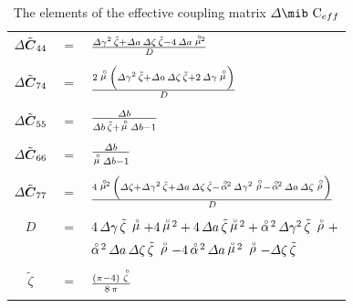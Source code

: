 \begin{table}
\begin{tabular*}{136mm}{ccl}
         
${{\mit \Delta} \tilde{\bmi C}}_{44}$&$=$& ${{{{\mit \Delta} \gamma^2}\,{\tilde{\zeta}}
 + {\mit \Delta}a\,{\mit \Delta} \zeta\,{\tilde{\zeta}} - 4\,{\mit 
\Delta}a\,{\rf{\mu}\!{}^{2}}}\over {{\it D}}} $\\

&&\\

${{\mit \Delta} \tilde{\bmi C}}_{74}$&$=$&${{2\,\rf{\mu}\,
       \left( {{\mit \Delta} \gamma^2}\,{\tilde{\zeta}} + {\mit \Delta}a\,{\mit \Delta} \zeta\,{\tilde{\zeta}} + 
         2\,{\mit \Delta} \gamma\,\rf{\mu} \right) }\over {{\it D}}}$\\

&&\\

${{\mit \Delta} \tilde{\bmi C}}_{55}$&$=$&${{{\mit \Delta}b}\over 
     {{\mit \Delta}b\,{\tilde{\zeta}} + \rf{\mu}\,{\mit \Delta}b -1 }}$\\

&&\\

${{\mit \Delta} \tilde{\bmi C}}_{66}$&$=$&${{{\mit \Delta}b}\over 
{\rf{\mu}\,{\mit \Delta}b  -1}}$\\

&&\\

${{\mit \Delta} \tilde{\bmi C}}_{77}$&$=$&${{4\,{\rf{\mu}\!{}^{2}}\,\left( {\mit \Delta} \zeta + {{\mit \Delta} \gamma^2}\,{\tilde{\zeta}} + 
         {\mit \Delta}a\,{\mit \Delta} \zeta\,{\tilde{\zeta}} - 
         {\rf{\alpha}\!{}^2}\,{{\mit \Delta} \gamma^2}\,\rf{\rho} - 
         {\rf{\alpha}\!{}^2}\,{\mit \Delta}a\,{\mit \Delta} \zeta\,\rf{\rho} \right) }\over 
         {{\it D}}}$\\

&&\\

$D$&$=$&$4\,{\mit \Delta} \gamma\,{\tilde{\zeta}}\,\rf{\mu} + 
  4\,{\rf{\mu}\!{}^{2}} + 4\,{\mit \Delta}a\,{\tilde{\zeta}}\,{\rf{\mu}\!{}^{2}} + 
  {\rf{\alpha}\!{}^2}\,{{\mit \Delta} 
  \gamma^2}\,{\tilde{\zeta}}\,\rf{\rho} +$\\
&& ${\rf{\alpha}\!{}^2}\,{\mit \Delta}a\,{\mit \Delta} \zeta\,{\tilde{\zeta}}\,\rf{\rho} - 
  4\,{\rf{\alpha}\!{}^2}\,{\mit \Delta}a\,{\rf{\mu}\!{}^{2}}\,\rf{\rho}
  -{\mit \Delta} \zeta\,{\tilde{\zeta}}  $\\

&&\\

$\tilde{\zeta}$&$=$&${{\left( \pi-4   \right) \,\rf{\zeta}}\over {8\,\pi 
}}$\\ 

&&\\ \hline\hline
\end{tabular*}
\caption{\label{CeffTable} 
{ The elements of the effective coupling 
matrix ${\mit \Delta}{\mbox{\mib C}_{eff}}$
}}
\end{table} 


